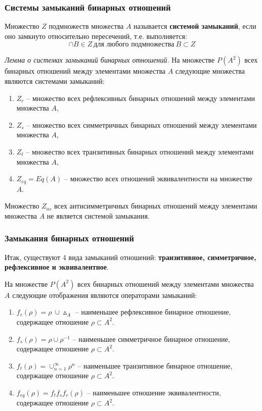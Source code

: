 \documentclass[bachelor, och, labwork]{shiza}
\begin{document}
\subsubsection{Системы замыканий бинарных отношений}

Множество $Z$ подмножеств множества $A$ называется \textbf{системой замыканий}, 
если оно замкнуто относительно пересечений, т.е. выполняется: \[\cap B \in Z ~\text{для любого подмножества}~ B \subset Z \]


\textit{Лемма о системах замыканий бинарных отношений.} На множестве $P(A^2)$ всех 
бинарных отношений между элементами множества $A$ следующие множества являются системами замыканий:

\begin{enumerate}
    \item $Z_r$ -- множество всех рефлексивных бинарных отношений между элементами множества $A$,
    \item $Z_s$ -- множество всех симметричных бинарных отношений между элементами множества $A$,
    \item $Z_t$ -- множество всех транзитивных бинарных отношений между элементами множества $A$,
    \item $Z_{eq} = Eq(A)$ -- множество всех отношений эквивалентности на множестве $A$.
\end{enumerate}

Множество $Z_{as}$ всех антисимметричных бинарных отношений между элементами множества $A$ не является системой замыкания.

\subsubsection{Замыкания бинарных отношений}
Итак, существуют 4 вида замыканий отношений: \textbf{транзитивное, симметричное, 
рефлексивное и эквивалентное}.

На множестве $P(A^2)$ всех бинарных отношений между элементами множества $A$ 
следующие отображения являются операторами замыканий:
\begin{enumerate}
    \item $f_r(\rho) = \rho ~\cup \vartriangle_A$ -- наименьшее рефлексивное
    бинарное отношение, содержащее отношение $\rho \subset A^2$. 
    \item $f_s(\rho) = \rho \cup \rho^{-1}$ -- наименьшее симметричное
    бинарное отношение, содержащее отношение $\rho \subset A^2$.
    \item $f_t(\rho) = \cup^{\infty}_{n=1} \rho^n$ -- наименьшее транзитивное
    бинарное отношение, содержащее отношение $\rho \subset A^2$.
    \item $f_{eq}(\rho) = f_tf_sf_r(\rho)$ -- наименьшее отношение эквивалентности,
    содержащее отношение $\rho \subset A^2$.
    
\end{enumerate}
\end{document}
